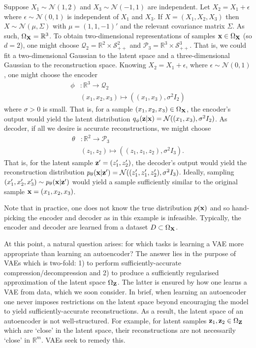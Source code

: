 \documentclass[11pt]{article}
\begin{document}
\begin{example}
    Suppose $X_1\sim\mathcal{N}(1,2)$ and $X_3\sim\mathcal{N}(-1,1)$ are independent. Let $X_2=X_1+\epsilon$ where $\epsilon\sim\mathcal{N}(0,1)$ is independent of $X_1$ and $X_3$. If $X=(X_1,X_2,X_3)$ then $X\sim\mathcal{N}(\mu,\Sigma)$ with $\mu=(1,1,-1)'$ and the relevant covariance matrix $\Sigma$. As such, $\Omega_{\mathbf{X}}=\mathbb{R}^3$. To obtain two-dimensional representations of samples $\mathbf{x}\in\Omega_{\mathbf{X}}$ (so $d=2$), one might choose $\mathcal{Q}_2=\mathbb{R}^2\times\mathcal{S}_{++}^2$ and $\mathcal{P}_3=\mathbb{R}^3\times\mathcal{S}_{++}^3$. That is, we could fit a two-dimensional Gaussian to the latent space and a three-dimensional Gaussian to the reconstruction space. Knowing $X_2=X_1+\epsilon$, where $\epsilon\sim\mathcal{N}(0,1)$, one might choose the encoder
    \begin{align*}
        \phi&:
        \mathbb{R}^3\to\mathcal{Q}_2\\
        &(x_1,x_2,x_3)\mapsto((x_1,x_3),\sigma^2I_2)
    \end{align*}
    where $\sigma>0$ is small. That is, for a sample $(x_1,x_2,x_3)\in\Omega_{\mathbf{X}}$, the encoder's output would yield the latent distribution $q_{\phi}(\mathbf{z}|\mathbf{x})=\mathcal{N}((x_1,x_3),\sigma^2I_2)$. As decoder, if all we desire is accurate reconstructions, we might choose
    \begin{align*}
        \theta&:
        \mathbb{R}^2\to\mathcal{P}_3\\
        &(z_1,z_2)\mapsto((z_1,z_1,z_2), \sigma^2I_3).
    \end{align*}
    That is, for the latent sample $\mathbf{z}'=(z_1',z_2')$, the decoder's output would yield the reconstruction distribution $p_{\theta}(\mathbf{x}|\mathbf{z}')=\mathcal{N}((z_1',z_1',z_2'),\sigma^2I_3)$. Ideally, sampling $(x_1',x_2',x_3')\sim p_{\theta}(\mathbf{x}|\mathbf{z}')$ would yield a sample sufficiently similar to the original sample $\mathbf{x}=(x_1,x_2,x_3)$.

    Note that in practice, one does not know the true distribution $p(\mathbf{x})$ and so hand-picking the encoder and decoder as in this example is infeasible. Typically, the encoder and decoder are learned from a dataset $D\subset\Omega_{\mathbf{X}}$.
\end{example}

At this point, a natural question arises: for which tasks is learning a VAE more appropriate than learning an autoencoder? The answer lies in the purpose of VAEs which is two-fold: 1) to perform sufficiently-accurate compression/decompression and 2) to produce a sufficiently regularised approximation of the latent space $\Omega_{\mathbf{Z}}$. The latter is ensured by how one learns a VAE from data, which we soon consider. In brief, when learning an autoencoder one never imposes restrictions on the latent space beyond encouraging the model to yield sufficiently-accurate reconstructions. As a result, the latent space of an autoencoder is not well-structured. For example, for latent samples $\mathbf{z}_1,\mathbf{z}_2\in\Omega_{\mathbf{Z}}$ which are `close' in the latent space, their reconstructions are not necessarily `close' in $\mathbb{R}^m$. VAEs seek to remedy this.
\end{document}
